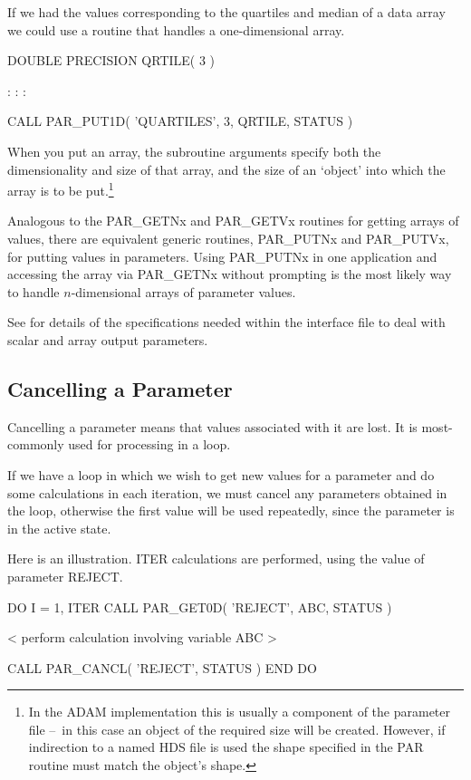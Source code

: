 \documentclass[twoside,11pt,nolof]{starlink}
\providecommand{\dash}{--}
\begin{document}
If we had the values corresponding to the quartiles and median of a
data array we could use a routine that handles a one-dimensional array.
\begin{terminalv}
      DOUBLE PRECISION QRTILE( 3 )

          :       :       :

      CALL PAR_PUT1D( 'QUARTILES', 3, QRTILE, STATUS )
\end{terminalv}

When you put an array, the subroutine arguments specify both the
dimensionality and size of that array, and the size of an `object' into
which the array is to be put.\footnote{In the ADAM implementation this
is usually a component of the parameter file \dash\ in this case an object of
the required size will be created.  However, if indirection to a named
HDS file is used the shape specified in the PAR routine must match the
object's shape.}

Analogous to the PAR\_GETNx and PAR\_GETVx routines for getting arrays
of values, there are equivalent generic routines, PAR\_PUTNx and
PAR\_PUTVx, for putting values in parameters.  Using PAR\_PUTNx in one
application and accessing the array via PAR\_GETNx without prompting is
the most likely way to handle $n$-dimensional arrays of parameter
values.

See
 for details of the specifications needed within
the interface file to deal with scalar and array output parameters.

\subsection{Cancelling a Parameter}

Cancelling a parameter means that values associated with it are lost.
It is most-commonly used for processing in a loop.

If we have a loop in which we wish to get new values for a parameter and
do some calculations in each iteration, we must cancel any parameters
obtained in the loop, otherwise the first value will be used repeatedly,
since the parameter is in the active state.

Here is an illustration.  ITER calculations are performed, using
the value of parameter REJECT.

\begin{terminalv}
      DO I = 1, ITER
         CALL PAR_GET0D( 'REJECT', ABC, STATUS )

            < perform calculation involving variable ABC >

         CALL PAR_CANCL( 'REJECT', STATUS )
      END DO
\end{terminalv}
\end{document}
